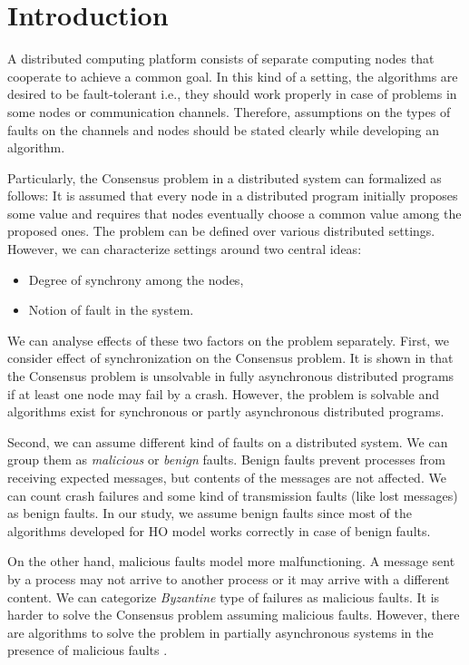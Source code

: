 \documentclass{llncs}
\begin{document}
\section{Introduction}
A distributed computing platform consists of separate computing nodes that cooperate to achieve a common goal. In this kind of a setting, the algorithms are desired to be fault-tolerant i.e., they should work properly in case of problems in some nodes or communication channels. Therefore, assumptions on the types of faults on the channels and nodes should be stated clearly while developing an algorithm. 

Particularly, the Consensus problem in a distributed system can formalized as follows: It is assumed that every node in a distributed program initially proposes some value and requires that nodes eventually choose a common value among the proposed ones. The problem can be defined over various distributed settings. However, we can characterize settings around two central ideas: 
\begin{itemize}
\item Degree of synchrony among the nodes,
\item Notion of fault in the system.
\end{itemize}

We can analyse effects of these two factors on the problem separately. First, we consider effect of synchronization on the Consensus problem. It is shown in \cite{fischer85} that the Consensus problem is unsolvable in fully asynchronous distributed programs if at least one node may fail by a crash. However, the problem is solvable and algorithms exist for synchronous or partly asynchronous distributed programs.

Second, we can assume different kind of faults on a distributed system. We can group them as \emph{malicious} or \emph{benign} faults. Benign faults prevent processes from receiving expected messages, but contents of the messages are not affected. We can count crash failures and some kind of transmission faults (like lost messages) as benign faults. In our study, we assume benign faults since most of the algorithms developed for HO model works correctly in case of benign faults. 

On the other hand, malicious faults model more malfunctioning. A message sent by a process may not arrive to another process or it may arrive with a different content. We can categorize \emph{Byzantine} type of failures as malicious faults. It is harder to solve the Consensus problem assuming malicious faults. However, there are algorithms to solve the problem in partially asynchronous systems in the presence of malicious faults \cite{dwork88}.
\end{document}

